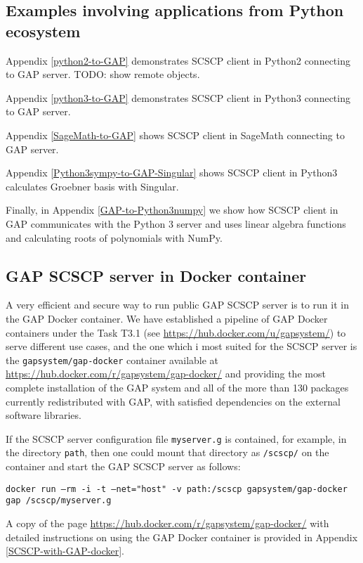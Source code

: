 \documentclass{deliverablereport}
\begin{document}
\subsection{Examples involving applications from Python ecosystem}

Appendix \ref{python2-to-GAP} demonstrates SCSCP client in Python2 connecting to GAP server.
TODO: show remote objects.

Appendix \ref{python3-to-GAP} demonstrates SCSCP client in Python3 connecting to GAP server.

Appendix \ref{SageMath-to-GAP} shows SCSCP client in SageMath connecting to GAP server.

Appendix \ref{Python3sympy-to-GAP-Singular} shows SCSCP client in Python3 calculates Groebner basis with Singular.

Finally, in Appendix \ref{GAP-to-Python3numpy} we show how
SCSCP client in GAP communicates with the Python 3 server
and uses linear algebra functions and calculating roots
of polynomials with NumPy.

\subsection{GAP SCSCP server in Docker container}\label{gap-docker}

A very efficient and secure way to run public GAP SCSCP
server is to run it in the GAP Docker container. 
We have established a pipeline of GAP Docker containers
under the Task T3.1 (see \url{https://hub.docker.com/u/gapsystem/})
to serve different use cases, and the one which i most
suited for the SCSCP server is the {\tt gapsystem/gap-docker} 
container available at \url{https://hub.docker.com/r/gapsystem/gap-docker/} and
providing the most complete installation
of the GAP system and all of the more than 130 packages
currently redistributed with GAP, with satisfied dependencies
on the external software libraries.

If the SCSCP server configuration file {\tt myserver.g} is 
contained, for example, in the directory {\tt path}, 
then one could mount that directory as {\tt /scscp/} on the
container and start the GAP SCSCP server as follows:

{\tiny{\tt docker run --rm -i -t --net="host" -v path:/scscp gapsystem/gap-docker gap /scscp/myserver.g}}

A copy of the page \url{https://hub.docker.com/r/gapsystem/gap-docker/}
with detailed instructions on using the GAP Docker container 
is provided in Appendix \ref{SCSCP-with-GAP-docker}.
\end{document}
